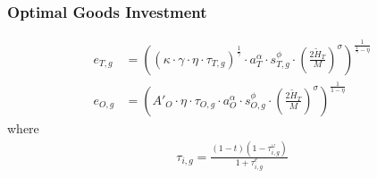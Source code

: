 \documentclass[11pt,hyperref={bookmarks=false},table,aspectratio=169]{beamer}
\begin{document}
\begin{frame}
	\frametitle{Optimal Goods Investment} 
	\label{good_inv}
	\begin{align}
		e_{T,g} & = \left( \left(\kappa \cdot \gamma \cdot \eta \cdot \tau_{T,g} \right)^\frac{1}{\gamma} \cdot a_T^{\alpha} \cdot s_{T,g}^{\phi} \cdot \left(\tfrac{2\widetilde{H}_T}{M}\right)^{\sigma}\right)^{\frac{1}{\frac{1}{\gamma}-\eta}}  \nonumber\\
		e_{O,g} & = \left( {{A'}_{O}} \cdot \eta \cdot\tau_{O,g} \cdot a_O^\alpha \cdot s_{O,g}^\phi \cdot  \left(\tfrac{2\widetilde{H}_T}{M}\right)^\sigma \right)^{\frac{1}{1-\eta}} \nonumber
	\end{align}
	where
	\begin{align}
		\tau_{i,g} =\frac{(1-t)(1-\tau^{\omega}_{i,g})}{1+\tau^e_{i,g}} \nonumber
	\end{align}
	\hfill\hyperlink{eqm}{}
\end{frame}
\end{document}
